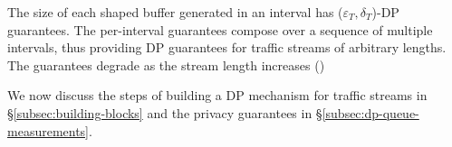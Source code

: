 The size of each shaped buffer generated in an interval has ($\varepsilon_{T},
\delta_{T}$)-DP guarantees. The per-interval guarantees
compose over a sequence of multiple intervals, thus providing DP guarantees for
traffic streams of arbitrary lengths. The guarantees degrade as the stream length increases ()

%
We now discuss the steps of building a DP mechanism for
traffic streams in \S\ref{subsec:building-blocks} and the
privacy guarantees in \S\ref{subsec:dp-queue-measurements}.



